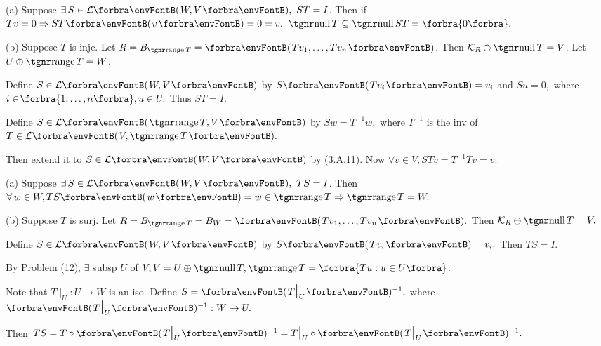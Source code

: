 \documentclass[a4paper, 11pt, UTF8]{article}
\begin{document}
\begin{large}
\par\quad
(a) Suppose $\exists\,S\in\Lm{W,V},\,\,ST=I$. Then if $Tv=0\Rightarrow ST\Par{v}=0=v.$ \Or $\null T\subseteq\null ST=\zeroSubs.$\par\quad
(b) Suppose $T$ is inje. Let $R=B_{\range T}=\Par{Tv_1,\dots,Tv_n}$. Then $\mathcal{K}_R\oplus\null T=V$. Let $U\oplus\range T=W$.\par\quad\Hb
Define $S\in\Lm{W,V}$ by $S\Par{Tv_i}=v_i$ and $Su=0,$ where $i\in\!\Bra{1,\dots,n},u\in U.$ Thus $ST=I.$\par\vspace{3pt}\quad\Hb
\Or Define $S\in\Lm{\range T,V}$ by $Sw=T^{-1}w,$ {\tgsl where $T^{-1}$ is the inv of $T\in\Lm{V,\range T}.$}\par\quad\Hb
Then extend it to $S\in\Lm{W,V}$ by (3.A.11). Now $\forall v\in V,STv=T^{-1}Tv=v.$\PfEnd
\SepLine

\par\quad
(a) Suppose $\exists\,S\in\Lm{W,V},\,\,TS=I$. Then $\forall\,w\in W,TS\Par{w}=w\in\range T\Rightarrow \range T=W.$\par\quad
(b) Suppose $T$ is surj. Let $R=B_{\range T}=B_{W}=\Par{Tv_1,\dots,Tv_n}.$ Then $\mathcal{K}_R\oplus\null T=V.$\par\quad\Hb
Define $S\in\Lm{W,V}$ by $S\Par{Tv_i}=v_i.$ Then $TS=I.$\par\vspace{3pt}\quad\Hb
\Or By Problem (12), $\exists$ subsp $U$ of $V,V=U\oplus\null T,\range T=\Bra{Tu:u\in U}$.\par\quad\Hb
Note that $T\mid_U:U\rightarrow W$ is an iso. Define $S=\Par{T\mid_U}{^{-1}},$ where $\Par{T\mid_U}{^{-1}}:W\rightarrow U.$\par\quad\Hb
Then $TS=T\circ\Par{T\mid_U}{^{-1}}=T\mid_U\circ\Par{T\mid_U}{^{-1}}.$\PfEnd
\SepLine


\end{large}
\end{document}
